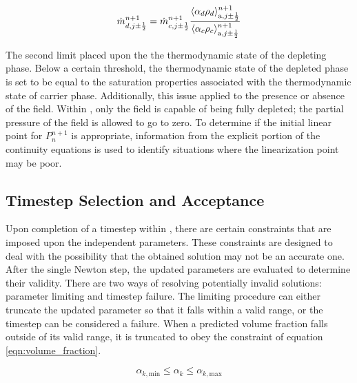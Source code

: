 \begin{equation}
\label{eqn:velRelinearization}
\dot{m}^{n+1}_{d, j \pm \onehalf} = \dot{m}^{n+1}_{c, j \pm \onehalf} \frac{\ave{\alpha_{d} \rho_{d}}^{n+1}_{\text{a}, j \pm \onehalf}}{\ave{\alpha_{c} \rho_{c}}^{n+1}_{\text{a}, j \pm \onehalf}}
\end{equation}

The second limit placed upon the the thermodynamic state of the depleting phase.
Below a certain threshold, the thermodynamic state of the depleted phase is set to be equal to the saturation properties associated with the thermodynamic state of carrier phase.
Additionally, this issue applied to the presence or absence of the \ncg{} field.
Within \cobra{}, only the \ncg{} field is capable of being fully depleted; the partial pressure of the \ncg{} field is allowed to go to zero.
To determine if the initial linear point for $P^{n+1}_{n}$ is appropriate, information from the explicit portion of the continuity equations is used to identify situations where the linearization point may be poor.

\subsection{Timestep Selection and Acceptance}
\label{subsect:nlnTimesteps}

Upon completion of a timestep within \cobra{}, there are certain constraints that are imposed upon the independent parameters.
These constraints are designed to deal with the possibility that the obtained solution may not be an accurate one.
After the single Newton step, the updated parameters are evaluated to determine their validity.
There are two ways of resolving potentially invalid solutions: parameter limiting and timestep failure.
The limiting procedure can either truncate the updated parameter so that it falls within a valid range, or the timestep can be considered a failure.
When a predicted volume fraction falls outside of its valid range, it is truncated to obey the constraint of equation \eqref{eqn:volume_fraction}.

\begin{equation}
\label{eqn:volume_fraction}
\alpha_{k,\text{min}} \leq \alpha_k \leq \alpha_{k,\text{max}} 
\end{equation}

